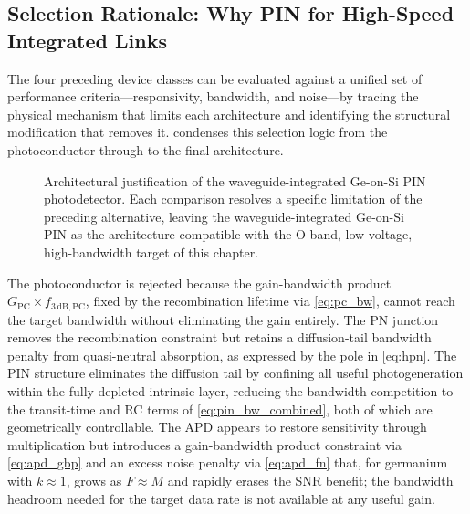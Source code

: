 \subsection[Selection Rationale]{Selection Rationale: Why PIN for High-Speed Integrated Links}
\label{subsec:pd_arch_compare}

The four preceding device classes can be evaluated against a unified set of
performance criteria---responsivity, bandwidth, and noise---by tracing the
physical mechanism that limits each architecture and identifying the structural
modification that removes it.  condenses this
selection logic from the photoconductor through to the final architecture.

\begin{figure}[H]
    \centering
    \caption{Architectural justification of the waveguide-integrated Ge-on-Si
    PIN photodetector. Each comparison resolves a specific limitation of the
    preceding alternative, leaving the waveguide-integrated Ge-on-Si PIN as the
    architecture compatible with the O-band, low-voltage, high-bandwidth target
    of this chapter.}
    \label{fig:pd_evolution_ladder}
\end{figure}

The photoconductor is rejected because the gain-bandwidth product
$G_{\mathrm{PC}}\times f_{3\,\mathrm{dB,PC}}$, fixed by the recombination
lifetime via \cref{eq:pc_bw}, cannot reach the target bandwidth without
eliminating the gain entirely. The PN junction removes the recombination
constraint but retains a diffusion-tail bandwidth penalty from quasi-neutral
absorption, as expressed by the pole in \cref{eq:hpn}. The PIN structure
eliminates the diffusion tail by confining all useful photogeneration within
the fully depleted intrinsic layer, reducing the bandwidth competition to
the transit-time and RC terms of \cref{eq:pin_bw_combined}, both of which
are geometrically controllable. The APD appears to restore sensitivity
through multiplication but introduces a gain-bandwidth product constraint
via \cref{eq:apd_gbp} and an excess noise penalty via \cref{eq:apd_fn}
that, for germanium with $k\approx 1$, grows as $F\approx M$ and rapidly
erases the SNR benefit; the bandwidth headroom needed for the target data
rate is not available at any useful gain.

